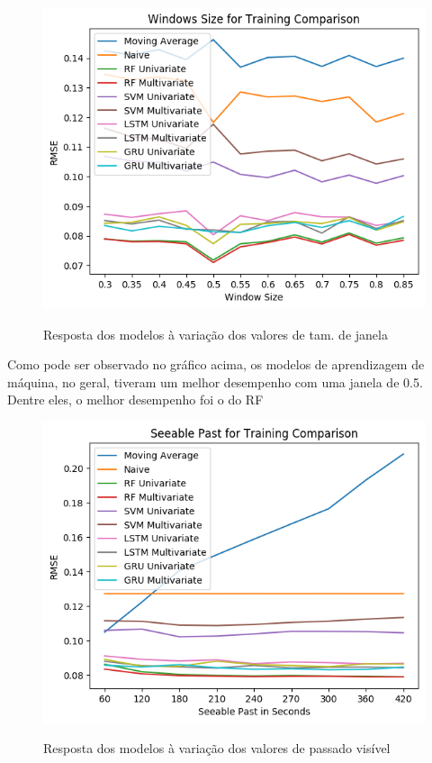 \begin{figure}[H]
    \centering
    \includegraphics[scale=0.8]{monography/img/windows_size_for_training_comparison_rmse.png}
    \label{figure:rf}
    \caption{Resposta dos modelos à variação dos valores de tam. de janela \textit{\acrshort{}}\footnotemark}
\end{figure} 


Como pode ser observado no gráfico acima, os modelos de aprendizagem de máquina, no geral, tiveram um melhor desempenho com uma janela de 0.5. Dentre eles, o melhor desempenho foi o do \acrshort{RF}

\begin{figure}[H]
    \centering
    \includegraphics[scale=0.8]{monography/img/seeable_past_for_training_comparison_rmse.png}
    \label{figure:rf}
    \caption{Resposta dos modelos à variação dos valores de passado visível \textit{\acrshort{}}\footnotemark}
\end{figure}

